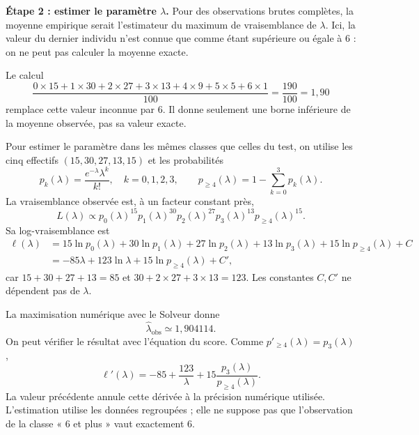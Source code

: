 {{\textbf{Étape 2 : estimer le paramètre $\lambda$.} Pour des observations brutes complètes, la moyenne empirique serait l'estimateur du maximum de vraisemblance de $\lambda$. Ici, la valeur du dernier individu n'est connue que comme étant supérieure ou égale à 6 : on ne peut pas calculer la moyenne exacte.

Le calcul
\[
\frac{0\times15+1\times30+2\times27+3\times13+4\times9+5\times5+6\times1}{100}
=\frac{190}{100}=1{,}90
\]
remplace cette valeur inconnue par 6. Il donne seulement une borne inférieure de la moyenne observée, pas sa valeur exacte.

\begin{minipage}{\linewidth}
Pour estimer le paramètre dans les mêmes classes que celles du test, on utilise les cinq effectifs $(15,30,27,13,15)$ et les probabilités
\[
p_k(\lambda)=\frac{e^{-\lambda}\lambda^k}{k!},\quad k=0,1,2,3,
\qquad p_{\geq4}(\lambda)=1-\sum_{k=0}^3p_k(\lambda).
\]
La vraisemblance observée est, à un facteur constant près,
\[
L(\lambda)\propto p_0(\lambda)^{15}p_1(\lambda)^{30}p_2(\lambda)^{27}
 p_3(\lambda)^{13}p_{\geq4}(\lambda)^{15}.
\]
Sa log-vraisemblance est
\begin{align*}
\ell(\lambda)
&=15\ln p_0(\lambda)+30\ln p_1(\lambda)+27\ln p_2(\lambda)
 +13\ln p_3(\lambda)+15\ln p_{\geq4}(\lambda)+C\\
&=-85\lambda+123\ln\lambda+15\ln p_{\geq4}(\lambda)+C',
\end{align*}
car $15+30+27+13=85$ et $30+2\times27+3\times13=123$. Les constantes $C,C'$ ne dépendent pas de $\lambda$.
\end{minipage}\par\smallskip
\begin{minipage}{\linewidth}
La maximisation numérique avec le Solveur donne
\[
\widehat\lambda_{\mathrm{obs}}\simeq1{,}904114.
\]
On peut vérifier le résultat avec l'équation du score. Comme $p'_{\geq4}(\lambda)=p_3(\lambda)$,
\[
\ell'(\lambda)=-85+\frac{123}{\lambda}
 +15\frac{p_3(\lambda)}{p_{\geq4}(\lambda)}.
\]
La valeur précédente annule cette dérivée à la précision numérique utilisée. L'estimation utilise les données regroupées ; elle ne suppose pas que l'observation de la classe « 6 et plus » vaut exactement 6.
\end{minipage}\par\smallskip

}}
